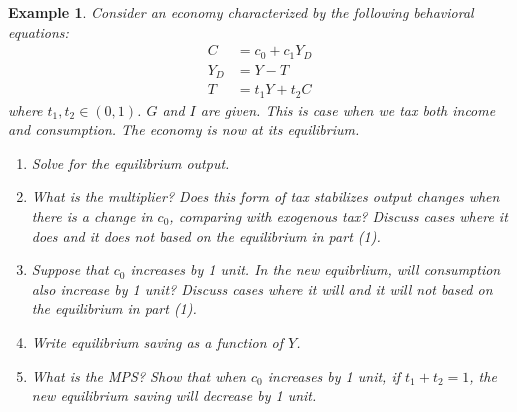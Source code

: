 \documentclass[12pt]{article}
\newtheorem{example}{Example}
\begin{document}
\begin{example}
    Consider an economy characterized by the following behavioral equations:
    \begin{align*}
        C &= c_0 + c_1 Y_D\\
        Y_D &= Y - T\\
        T &= t_1 Y + t_2 C
    \end{align*}
    where $t_1, t_2 \in (0,1)$. $G$ and $I$ are given. This is case when we tax both income and consumption. The economy is now at its equilibrium.
    \begin{enumerate}[label=(\arabic*)]
        \item Solve for the equilibrium output.
        \item What is the multiplier? Does this form of tax stabilizes output changes when there is a change in $c_0$, comparing with exogenous tax? Discuss cases where it does and it does not based on the equilibrium in part (1).
        \item Suppose that $c_0$ increases by 1 unit. In the new equibrlium, will consumption also increase by 1 unit? Discuss cases where it will and it will not based on the equilibrium in part (1).
        \item Write equilibrium saving as a function of $Y$.
        \item What is the MPS? Show that when $c_0$ increases by 1 unit, if $t_1+t_2=1$, the new equilibrium saving will decrease by 1 unit.
    \end{enumerate} 
\end{example}
\end{document}
